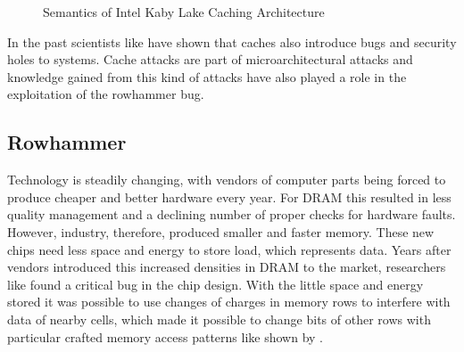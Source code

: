 \begin{figure}
  \centering
  \caption{Semantics of Intel Kaby Lake Caching Architecture}
  \label{fig:intelcache}
\end{figure}

In the past scientists like  have
shown that caches also introduce bugs and security holes to systems. Cache
attacks are part of microarchitectural attacks and knowledge gained from this
kind of attacks have also played a role in the exploitation of the rowhammer
bug.


\subsection{Rowhammer}


Technology is steadily changing, with vendors of computer parts being forced to
produce cheaper and better hardware every year. For DRAM this resulted in less
quality management and a declining number of proper checks for hardware faults.
However, industry, therefore, produced smaller and faster memory. These new
chips need less space and energy to store load, which represents data. Years
after vendors introduced this increased densities in DRAM to the market,
researchers like  found a critical bug in the chip
design. With the little space and energy stored it was possible to use changes
of charges in memory rows to interfere with data of nearby cells, which made it
possible to change bits of other rows with particular crafted memory access
patterns like shown by .

